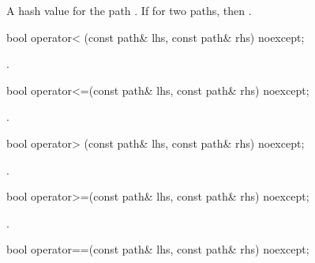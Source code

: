 \begin{itemdescr}
\pnum
\returns A hash value for the path . If
  for two paths,  then .
\end{itemdescr}

\begin{itemdecl}
bool operator< (const path& lhs, const path& rhs) noexcept;
\end{itemdecl}

\begin{itemdescr}
\pnum
\returns {}.
\end{itemdescr}

\begin{itemdecl}
bool operator<=(const path& lhs, const path& rhs) noexcept;
\end{itemdecl}

\begin{itemdescr}
\pnum
\returns {}.
\end{itemdescr}

\begin{itemdecl}
bool operator> (const path& lhs, const path& rhs) noexcept;
\end{itemdecl}

\begin{itemdescr}
\pnum
\returns {}.
\end{itemdescr}

\begin{itemdecl}
bool operator>=(const path& lhs, const path& rhs) noexcept;
\end{itemdecl}

\begin{itemdescr}
\pnum
\returns {}.
\end{itemdescr}

\begin{itemdecl}
bool operator==(const path& lhs, const path& rhs) noexcept;
\end{itemdecl}

